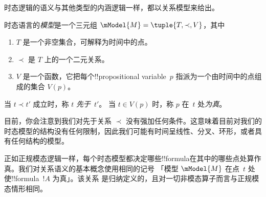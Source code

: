 \documentclass[../../../include/open-logic-section]{subfiles}
\begin{document}
时态逻辑的语义与其他类型的内涵逻辑一样，都以关系模型来给出。

\begin{defn}
  时态语言的\emph{模型}是一个三元组
  $\mModel{M} = \tuple{T, \prec, V}$，其中
  \begin{enumerate}
  \item $T$ 是一个非空集合，可解释为时间中的点。
  \item $\prec$ 是 $T$ 上的一个二元关系。
  \item $V$ 是一个函数，它把每个!!{propositional
    variable}~$p$ 指派为一个由时间中的点组成的集合 $V(p)$。
  \end{enumerate}
  当 $t \prec t'$ 成立时，称 $t$ \emph{先于}~$t'$。
  当 $t \in V(p)$ 时，称 $p$ 在~$t$ 处\emph{为真}。
\end{defn}

目前，你会注意到我们对先于关系 $\prec$ 没有强加任何条件。这意味着目前对我们的时态模型的结构没有任何限制，因此我们可能有时间呈线性、分叉、环形，或者具有任何结构的模型。

正如正规模态逻辑一样，每个时态模型都决定哪些!!{formula}在其中的哪些点处算作真。我们对关系语义的基本概念使用相同的记号
「模型 $\mModel{M}$ 在点~$t$ 处使!!{formula}~$!A$ 为真」。该关系
是归纳定义的，且对一切非模态算子而言与正规模态情形相同。
\end{document}
